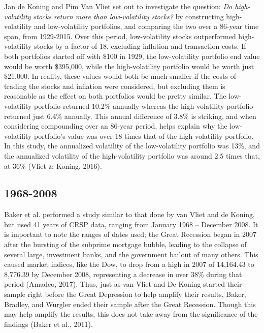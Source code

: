 \documentclass[12pt,twoside]{reedthesis}
\theoremstyle{definition}
\theoremstyle{definition}
\theoremstyle{definition}
\theoremstyle{remark}
\begin{document}
Jan de Koning and Pim Van Vliet set out to investigate the question:
\emph{Do high-volatility stocks return more than low-volatility stocks?}
by constructing high-volatility and low-volatility portfolios, and
comparing the two over a 86-year time span, from 1929-2015. Over this
period, low-volatility stocks outperformed high-volatility stocks by a
factor of 18, excluding inflation and transaction costs. If both
portfolios started off with \$100 in 1929, the low-volatility portfolio
end value would be worth \$395,000, while the high-volatility portfolio
would be worth just \$21,000. In reality, these values would both be
much smaller if the costs of trading the stocks and inflation were
considered, but excluding them is reasonable as the effect on both
portfolios would be pretty similar. The low-volatility portfolio
returned 10.2\% annually whereas the high-volatility portfolio returned
just 6.4\% annually. This annual difference of 3.8\% is striking, and
when considering compounding over an 86-year period, helps explain why
the low-volatility portfolio's value was over 18 times that of the
high-volatility portfolio. In this study, the annualized volatility of
the low-volatility portfolio was 13\%, and the annualized volatility of
the high-volatility portfolio was around 2.5 times that, at 36\% (Vliet
\& Koning, 2016).

\subsection{1968-2008}\label{section-1}

Baker et al. performed a study similar to that done by van Vliet and de
Koning, but used 41 years of CRSP data, ranging from January 1968 --
December 2008. It is important to note the ranges of dates used; the
Great Recession began in 2007 after the bursting of the subprime
mortgage bubble, leading to the collapse of several large, investment
banks, and the government bailout of many others. This caused market
indices, like the Dow, to drop from a high in 2007 of 14,164.43 to
8,776.39 by December 2008, representing a decrease in over 38\% during
that period (Amadeo, 2017). Thus, just as van Vliet and De Koning
started their sample right before the Great Depression to help amplify
their results, Baker, Bradley, and Wurgler ended their sample after the
Great Recession. Though this may help amplify the results, this does not
take away from the significance of the findings (Baker et al., 2011).
\end{document}
